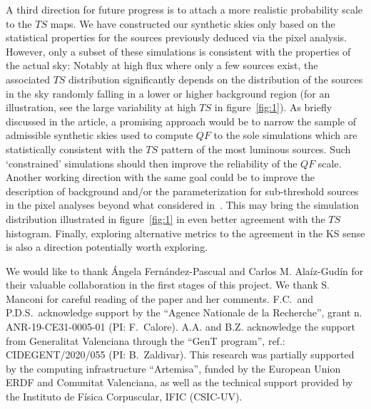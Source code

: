 \documentclass{article}
\begin{document}
A third direction for future progress is to attach a  more realistic probability scale to the $TS$ maps. We have constructed our synthetic skies only based on the statistical properties for the sources previously deduced via the pixel analysis. However, only a subset of these simulations is consistent with the properties of the actual sky: Notably at high flux where only a few sources exist, the associated $TS$ distribution significantly depends on the distribution of the sources in the sky randomly falling in a lower or higher background region (for an illustration, see the large variability at high $TS$ in figure~\ref{fig:1}). As briefly discussed in the article, a promising approach would be to narrow the sample of admissible synthetic skies used to compute $QF$ to the sole simulations which are statistically consistent with the $TS$ pattern of the most luminous sources. Such `constrained' simulations should then improve the reliability of the $QF$ scale. Another working direction with the same goal could be to improve the description of background and/or the parameterization for sub-threshold sources in the pixel analyses beyond what considered in~\cite{Amerio:2023uet}. This may bring the simulation distribution illustrated in figure~\ref{fig:1} in even better agreement with the $TS$ histogram. Finally, exploring alternative  metrics to the agreement in the KS sense is also a direction potentially worth exploring. 

\begin{acknowledgments}
We would like to thank Ángela Fernández-Pascual and Carlos M. Alaíz-Gudín for their valuable collaboration in the first stages of this project.  We thank S. Manconi for careful reading of the paper and her comments.
F.C.~and P.D.S.~acknowledge support by the ``Agence Nationale de la Recherche'', grant n. ANR-19-CE31-0005-01 (PI: F.~Calore). A.A. and B.Z. acknowledge the support from Generalitat Valenciana through the  ``GenT program'', ref.: CIDEGENT/2020/055 (PI: B.~Zaldivar). This research was partially supported by the computing infrastructure
``Artemisa'', funded by the European Union ERDF and
Comunitat Valenciana, as well as the technical support
provided by the Instituto de Física Corpuscular, IFIC
(CSIC-UV).

\end{acknowledgments}


\end{document}
